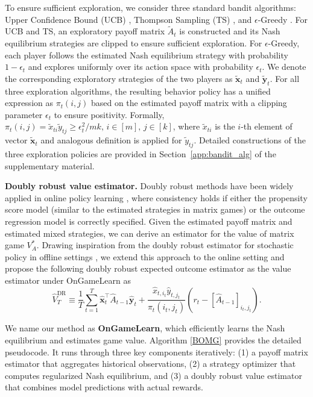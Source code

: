 \documentclass[12pt]{article}
\begin{document}
To ensure sufficient exploration, we consider three standard bandit algorithms: Upper Confidence Bound (UCB) \citep{li2011unbiased}, Thompson Sampling (TS) \citep{agrawal2013thompson}, and $\epsilon$-Greedy \citep{sutton1998reinforcement}. For UCB and TS, an exploratory payoff matrix $\widetilde{A}_t$ is constructed and its Nash equilibrium strategies are clipped to ensure sufficient exploration.  For $\epsilon$-Greedy, each player follows the estimated Nash equilibrium strategy with probability $1-\epsilon_t$ and explores uniformly over its action space with probability $\epsilon_t$. 
We denote the corresponding exploratory strategies of the two players as $\bm{\widetilde{x}}_t$ and $\bm{\widetilde{y}}_t$. 
For all three exploration algorithms, the resulting behavior policy has a unified expression as $\pi_t(i,j)$ based on the estimated payoff matrix with a clipping parameter $\epsilon_t$ to ensure positivity. Formally, $\pi_t(i,j) = \widetilde{x}_{ti}\widetilde{y}_{tj} \ge \epsilon_t^2/mk, \, i\in[m],\, j\in[k]$, where $\widetilde{x}_{ti}$ is the $i$-th element of vector $\bm{\widetilde{x}}_t$ and analogous definition is applied for $\widetilde{y}_{tj}$. 
Detailed constructions of the three exploration policies are provided in Section~\ref{app:bandit_alg} of the supplementary material.


\noindent\textbf{Doubly robust value estimator.} 
Doubly robust methods have been widely applied in online policy learning \citep{shen2024doubly,xu2024}, where consistency holds if either the propensity score model (similar to the estimated strategies in matrix games) or the outcome regression model is correctly specified. Given the estimated payoff matrix and estimated mixed strategies, we can derive an estimator for the value of matrix game $V_A^\ast$. Drawing inspiration from the doubly robust estimator for stochastic policy in offline settings \citep{jiang2016doubly}, we extend this approach to the online setting and propose the following doubly robust expected outcome estimator as the value estimator under OnGameLearn as
\begin{equation}
\label{equ:dr}
    \widehat{V}_T^{\text{DR}} \equiv \frac{1}{T}\sum_{t=1}^T \widehat{\bm{x}}_t^\top \widehat{A}_{t-1}\widehat{\bm{y}}_t + \frac{\widehat{x}_{t,i_t}\widehat{y}_{t,j_t}}{{\pi}_t(i_t,j_t)}(r_t - [\widehat{A}_{t-1}]_{i_t,j_t}).
\end{equation}

We name our method as \textbf{OnGameLearn}, which efficiently learns the Nash equilibrium and estimates game value. Algorithm \ref{BOMG} provides the detailed pseudocode. It runs through three key components iteratively: (1) a payoff matrix estimator that aggregates historical observations, (2) a strategy optimizer that computes regularized Nash equilibrium, and (3) a doubly robust value estimator that combines model predictions with actual rewards. 
\end{document}
